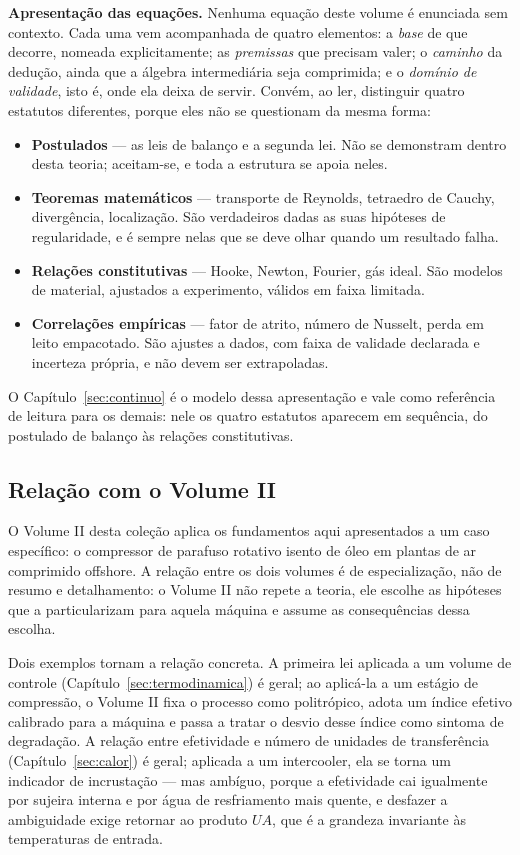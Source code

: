 \documentclass[12pt,a4paper]{article}
\numberwithin{equation}{section}
\numberwithin{table}{section}
\numberwithin{figure}{section}
\begin{document}
\textbf{Apresentação das equações.} Nenhuma equação deste volume é enunciada
sem contexto. Cada uma vem acompanhada de quatro elementos: a \emph{base} de
que decorre, nomeada explicitamente; as \emph{premissas} que precisam valer;
o \emph{caminho} da dedução, ainda que a álgebra intermediária seja
comprimida; e o \emph{domínio de validade}, isto é, onde ela deixa de servir.
Convém, ao ler, distinguir quatro estatutos diferentes, porque eles não se
questionam da mesma forma:

\begin{itemize}
	\item \textbf{Postulados} --- as leis de balanço e a segunda lei. Não se
	demonstram dentro desta teoria; aceitam-se, e toda a estrutura se apoia
	neles.
	\item \textbf{Teoremas matemáticos} --- transporte de Reynolds, tetraedro
	de Cauchy, divergência, localização. São verdadeiros dadas as suas hipóteses
	de regularidade, e é sempre nelas que se deve olhar quando um resultado
	falha.
	\item \textbf{Relações constitutivas} --- Hooke, Newton, Fourier, gás
	ideal. São modelos de material, ajustados a experimento, válidos em faixa
	limitada.
	\item \textbf{Correlações empíricas} --- fator de atrito, número de
	Nusselt, perda em leito empacotado. São ajustes a dados, com faixa de
	validade declarada e incerteza própria, e não devem ser extrapoladas.
\end{itemize}

O Capítulo~\ref{sec:continuo} é o modelo dessa apresentação e vale como
referência de leitura para os demais: nele os quatro estatutos aparecem em
sequência, do postulado de balanço às relações constitutivas.

\subsection{Relação com o Volume II}

O Volume II desta coleção aplica os fundamentos aqui apresentados a um caso
específico: o compressor de parafuso rotativo isento de óleo em plantas de ar
comprimido offshore. A relação entre os dois volumes é de especialização, não
de resumo e detalhamento: o Volume II não repete a teoria, ele escolhe as
hipóteses que a particularizam para aquela máquina e assume as consequências
dessa escolha.

Dois exemplos tornam a relação concreta. A primeira lei aplicada a um volume
de controle (Capítulo~\ref{sec:termodinamica}) é geral; ao aplicá-la a um
estágio de compressão, o Volume II fixa o processo como politrópico, adota um
índice efetivo calibrado para a máquina e passa a tratar o desvio desse índice
como sintoma de degradação. A relação entre efetividade e número de unidades
de transferência (Capítulo~\ref{sec:calor}) é geral; aplicada a um intercooler,
ela se torna um indicador de incrustação --- mas ambíguo, porque a efetividade
cai igualmente por sujeira interna e por água de resfriamento mais quente, e
desfazer a ambiguidade exige retornar ao produto $UA$, que é a grandeza
invariante às temperaturas de entrada.
\end{document}
